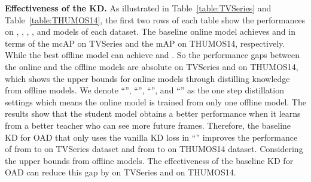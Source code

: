 \documentclass[final]{cvpr}
\begin{document}
\begin{table}[t]
\centering
\caption{Comparisons in terms of mcAP (\%) on the TVSeries dataset. The first two rows show the baseline performance on the online and different offline models. Rest of the table illustrate the effectiveness of different KD paths and KD losses for online .}
\label{table:TVSeries}
\end{table}




\noindent \textbf{Effectiveness of the KD.}
As illustrated in Table~\ref{table:TVSeries} and Table~\ref{table:THUMOS14}, the first two rows of each table show the performances on , , , , and  models of each dataset. The baseline online model  achieves  and  in terms of the mcAP on TVSeries and the mAP on THUMOS14, respectively. While the best offline model  can achieve  and . So the performance gaps between the online and the offline models are absolute  on TVSeries and  on THUMOS14, which shows the upper bounds for online models through distilling knowledge from offline models. We denote ``'', ``'', ``'', and ``'' as the one step distillation settings which means the online model  is trained from only one offline model.  The results show that the student model  obtains a better performance when it learns from a better teacher who can see more future frames. Therefore, the baseline KD for OAD that only uses the vanilla KD loss  in ``'' improves the performance of  from  to  on TVSeries dataset and from  to  on THUMOS14 dataset. Considering the upper bounds from offline models. The effectiveness of the baseline KD for OAD can reduce this gap by  on TVSeries and  on THUMOS14.
\end{document}
